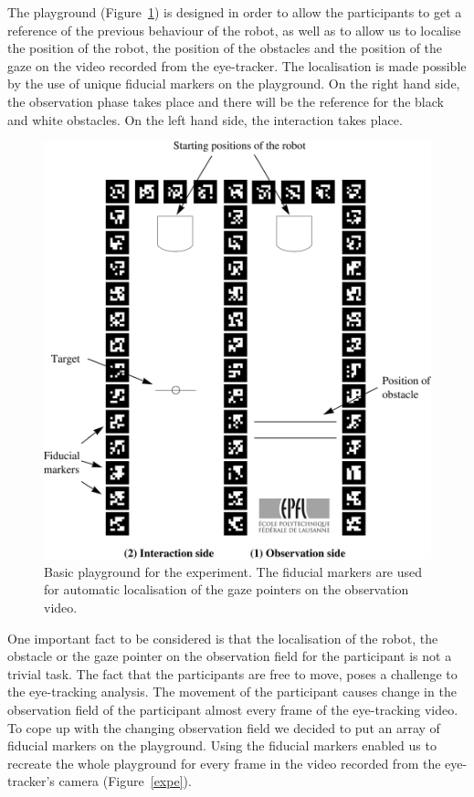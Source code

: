 \documentclass{sig-alternate}
\begin{document}
The playground (Figure~\ref{playground}) is designed in order to allow the
participants to get a reference of the previous behaviour of the robot, as well
as to allow us to localise the position of the robot, the position of the
obstacles and the position of the gaze on the video recorded from the
eye-tracker. The localisation is made possible by the use of unique fiducial
markers on the playground. On the right hand side, the observation phase takes
place and there will be the reference for the black and white obstacles. On the
left hand side, the interaction takes place.

\begin{figure}
    \centering
    \includegraphics[width=0.9\linewidth]{maze}
    \caption{\small Basic playground for the experiment. The fiducial markers
    are used for automatic localisation of the gaze pointers on the observation
    video.}

    \label{playground}
\end{figure}

One important fact to be considered is that the localisation of the
robot, the obstacle or the gaze pointer on the observation field for the
participant is not a trivial task. The fact that the participants are
free to move, poses a challenge to the eye-tracking analysis. The
movement of the participant causes change in the observation field of
the participant almost every frame of the eye-tracking video. To cope up
with the changing observation field we decided to put an array of
fiducial markers on the playground. Using the fiducial markers enabled
us to recreate the whole playground for every frame in the video
recorded from the eye-tracker's camera (Figure~\ref{expe}).
\end{document}
